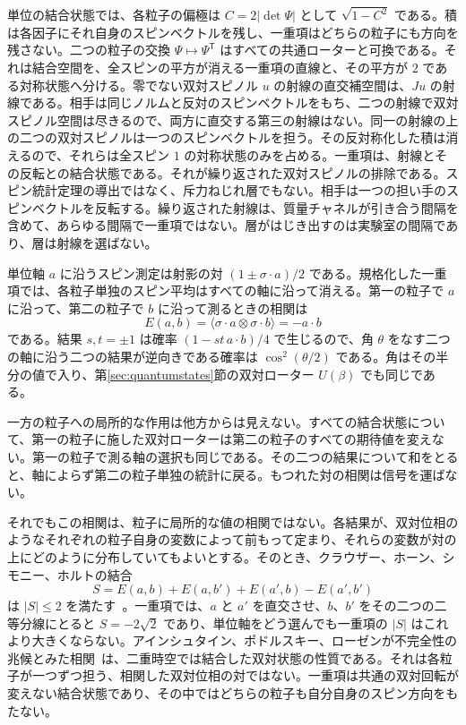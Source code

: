 \documentclass[a4paper]{article}
\begin{document}
単位の結合状態では、各粒子の偏極は $C=2|\det\Psi|$ として $\sqrt{1-C^2}$ である。積は各因子にそれ自身のスピンベクトルを残し、一重項はどちらの粒子にも方向を残さない。二つの粒子の交換 $\Psi\mapsto\Psi^{\mathsf T}$ はすべての共通ローターと可換である。それは結合空間を、全スピンの平方が消える一重項の直線と、その平方が $2$ である対称状態へ分ける。零でない双対スピノル $u$ の射線の直交補空間は、$Ju$ の射線である。相手は同じノルムと反対のスピンベクトルをもち、二つの射線で双対スピノル空間は尽きるので、両方に直交する第三の射線はない。同一の射線の上の二つの双対スピノルは一つのスピンベクトルを担う。その反対称化した積は消えるので、それらは全スピン $1$ の対称状態のみを占める。一重項は、射線とその反転との結合状態である。それが繰り返された双対スピノルの排除である。スピン統計定理の導出ではなく、斥力ねじれ層でもない。相手は一つの担い手のスピンベクトルを反転する。繰り返された射線は、質量チャネルが引き合う間隔を含めて、あらゆる間隔で一重項ではない。層がはじき出すのは実験室の間隔であり、層は射線を選ばない。

単位軸 $a$ に沿うスピン測定は射影の対 $(1\pm\sigma\cdot a)/2$ である。規格化した一重項では、各粒子単独のスピン平均はすべての軸に沿って消える。第一の粒子で $a$ に沿って、第二の粒子で $b$ に沿って測るときの相関は
\[
E(a,b)=\langle\sigma\cdot a\otimes\sigma\cdot b\rangle=-a\cdot b
\]
である。結果 $s,t=\pm1$ は確率 $(1-st\,a\cdot b)/4$ で生じるので、角 $\theta$ をなす二つの軸に沿う二つの結果が逆向きである確率は $\cos^2(\theta/2)$ である。角はその半分の値で入り、第\ref{sec:quantumstates}節の双対ローター $U(\beta)$ でも同じである。

一方の粒子への局所的な作用は他方からは見えない。すべての結合状態について、第一の粒子に施した双対ローターは第二の粒子のすべての期待値を変えない。第一の粒子で測る軸の選択も同じである。その二つの結果について和をとると、軸によらず第二の粒子単独の統計に戻る。もつれた対の相関は信号を運ばない。

それでもこの相関は、粒子に局所的な値の相関ではない。各結果が、双対位相のようなそれぞれの粒子自身の変数によって前もって定まり、それらの変数が対の上にどのように分布していてもよいとする。そのとき、クラウザー、ホーン、シモニー、ホルトの結合
\[
S=E(a,b)+E(a,b')+E(a',b)-E(a',b')
\]
は $|S|\le 2$ を満たす~\cite{bell1964,chsh1969}。一重項では、$a$ と $a'$ を直交させ、$b$、$b'$ をその二つの二等分線にとると $S=-2\sqrt2$ であり、単位軸をどう選んでも一重項の $|S|$ はこれより大きくならない。アインシュタイン、ポドルスキー、ローゼンが不完全性の兆候とみた相関~\cite{epr1935}は、二重時空では結合した双対状態の性質である。それは各粒子が一つずつ担う、相関した双対位相の対ではない。一重項は共通の双対回転が変えない結合状態であり、その中ではどちらの粒子も自分自身のスピン方向をもたない。
\end{document}
